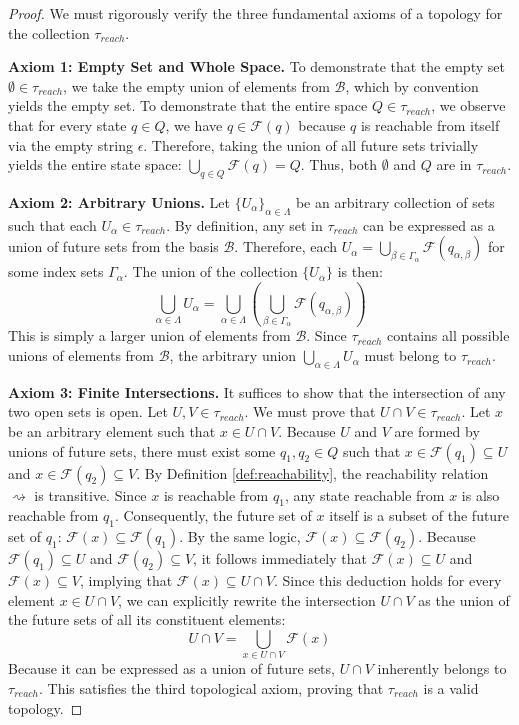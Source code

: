 \begin{proof}
We must rigorously verify the three fundamental axioms of a topology for the collection $\tau_{reach}$.

\textbf{Axiom 1: Empty Set and Whole Space.} 
To demonstrate that the empty set $\emptyset \in \tau_{reach}$, we take the empty union of elements from $\mathcal{B}$, which by convention yields the empty set. To demonstrate that the entire space $Q \in \tau_{reach}$, we observe that for every state $q \in Q$, we have $q \in \mathcal{F}(q)$ because $q$ is reachable from itself via the empty string $\epsilon$. Therefore, taking the union of all future sets trivially yields the entire state space: $\bigcup_{q \in Q} \mathcal{F}(q) = Q$. Thus, both $\emptyset$ and $Q$ are in $\tau_{reach}$.

\textbf{Axiom 2: Arbitrary Unions.}
Let $\{U_\alpha\}_{\alpha \in \Lambda}$ be an arbitrary collection of sets such that each $U_\alpha \in \tau_{reach}$. By definition, any set in $\tau_{reach}$ can be expressed as a union of future sets from the basis $\mathcal{B}$. Therefore, each $U_\alpha = \bigcup_{\beta \in \Gamma_\alpha} \mathcal{F}(q_{\alpha, \beta})$ for some index sets $\Gamma_\alpha$. The union of the collection $\{U_\alpha\}$ is then:
\[
\bigcup_{\alpha \in \Lambda} U_\alpha = \bigcup_{\alpha \in \Lambda} \left( \bigcup_{\beta \in \Gamma_\alpha} \mathcal{F}(q_{\alpha, \beta}) \right)
\]
This is simply a larger union of elements from $\mathcal{B}$. Since $\tau_{reach}$ contains all possible unions of elements from $\mathcal{B}$, the arbitrary union $\bigcup_{\alpha \in \Lambda} U_\alpha$ must belong to $\tau_{reach}$.

\textbf{Axiom 3: Finite Intersections.}
It suffices to show that the intersection of any two open sets is open. Let $U, V \in \tau_{reach}$. We must prove that $U \cap V \in \tau_{reach}$. 
Let $x$ be an arbitrary element such that $x \in U \cap V$. Because $U$ and $V$ are formed by unions of future sets, there must exist some $q_1, q_2 \in Q$ such that $x \in \mathcal{F}(q_1) \subseteq U$ and $x \in \mathcal{F}(q_2) \subseteq V$. 
By Definition \ref{def:reachability}, the reachability relation $\rightsquigarrow$ is transitive. Since $x$ is reachable from $q_1$, any state reachable from $x$ is also reachable from $q_1$. Consequently, the future set of $x$ itself is a subset of the future set of $q_1$: $\mathcal{F}(x) \subseteq \mathcal{F}(q_1)$. By the same logic, $\mathcal{F}(x) \subseteq \mathcal{F}(q_2)$.
Because $\mathcal{F}(q_1) \subseteq U$ and $\mathcal{F}(q_2) \subseteq V$, it follows immediately that $\mathcal{F}(x) \subseteq U$ and $\mathcal{F}(x) \subseteq V$, implying that $\mathcal{F}(x) \subseteq U \cap V$. 
Since this deduction holds for every element $x \in U \cap V$, we can explicitly rewrite the intersection $U \cap V$ as the union of the future sets of all its constituent elements:
\[
U \cap V = \bigcup_{x \in U \cap V} \mathcal{F}(x)
\]
Because it can be expressed as a union of future sets, $U \cap V$ inherently belongs to $\tau_{reach}$. This satisfies the third topological axiom, proving that $\tau_{reach}$ is a valid topology.


\end{proof}
